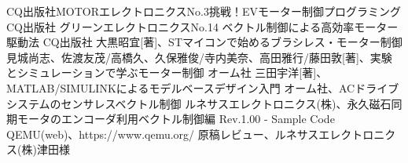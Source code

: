 \begin{thebibliography}{8}
CQ出版社MOTORエレクトロニクスNo.3挑戦！EVモーター制御プログラミング
CQ出版社 グリーンエレクトロニクスNo.14 ベクトル制御による高効率モーター駆動法
CQ出版社 大黒昭宜[著]、STマイコンで始めるブラシレス・モーター制御
見城尚志、佐渡友茂/高橋久、久保雅俊/寺内美奈、高田雅行/藤田敦[著]、実験とシミュレーションで学ぶモーター制御
オーム社 三田宇洋[著]、MATLAB/SIMULINKによるモデルベースデザイン入門
オーム社、ACドライブシステムのセンサレスベクトル制御
ルネサスエレクトロニクス(株)、永久磁石同期モータのエンコーダ利用ベクトル制御編 Rev.1.00 - Sample Code
QEMU(web)、https://www.qemu.org/
原稿レビュー、ルネサスエレクトロニクス(株)津田様
\end{thebibliography}